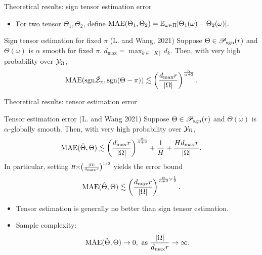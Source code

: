 \documentclass[10pt, mathserif]{beamer} %
\theoremstyle{definition}
\theoremstyle{plain}
\def\caliP{\mathscr{P}_{\textup{sgn}}}
\begin{document}
\begin{frame}{Theoretical results: sign tensor estimation error}
\begin{itemize}
\item For two tensor $\Theta_1,\Theta_2$, define $\textup{MAE}(\Theta_1,\Theta_2) = \mathbb{E}_{\omega\in\Pi}|\Theta_1(\omega)-\Theta_2(\omega)|.$
\end{itemize}
    \begin{block}{Sign tensor estimation for fixed $\pi$ (L. and Wang, 2021)}
    Suppose $\Theta\in\caliP(r)$ and  $\Theta(\omega)$ is $\alpha$ smooth for fixed $\pi$. $d_{\max}=\max_{k\in[K]} d_k$. Then, with very high probability over $\mathcal{Y}_\Omega$, 
\begin{align}
\textup{MAE}(\text{sgn}\hat {\mathcal{Z}}_\pi, \text{sgn}(\Theta-\pi)) \lesssim  \left({d_{\max} r\over |\Omega|}\right)^{\alpha\over \alpha+2}.
\end{align}
    \end{block}
\end{frame}

\begin{frame}{Theoretical results: tensor estimation error}
    \begin{block}{Tensor estimation error (L. and Wang 2021)}
    Suppose $\Theta\in\caliP(r)$ and  $\Theta(\omega)$ is $\alpha$-globally smooth. Then, with very high probability over $\mathcal{Y}_\Omega$, 
    \begin{equation}\label{eq:bound2}
\textup{MAE}(\hat \Theta, \Theta)\lesssim \left({d_{\max} r \over |\Omega|}\right)^{\alpha\over\alpha+2}+{1\over H}+{Hd_{\max} r \over |\Omega|}.
\end{equation}
In particular, setting $\scriptstyle H\asymp \left( |\Omega|\over d_{\max}r\right)^{1/2}$ yields the error bound
\begin{equation}\label{eq:real}
\textup{MAE}(\hat \Theta, \Theta)\lesssim \left(d_{\max}r \over |\Omega|\right)^{{\alpha \over \alpha+2} \vee {1\over 2}}.
\end{equation}
    \end{block}
    \begin{itemize}
        \item Tensor estimation is generally no better than sign tensor estimation.
        \item Sample complexity: \[\text{MAE}(\hat\Theta,\Theta)\rightarrow 0, \text{ as } {|\Omega|\over d_{\max}r}\rightarrow\infty.\]
    \end{itemize}
\end{frame}
\end{document}

